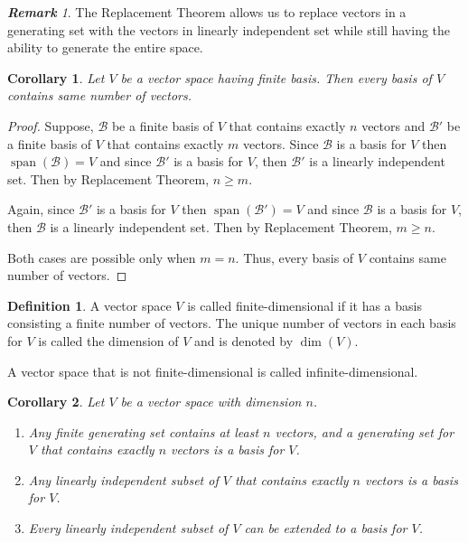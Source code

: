 \documentclass[12pt, a4paper]{article}
\newtheorem{corollary}{Corollary}[theorem]
\theoremstyle{definition}
\newtheorem{definition}{Definition}[section]
\theoremstyle{remark}
\newtheorem*{remark}{\textbf{Remark}}
\newcommand{\B}{\mathscr{B}}
\DeclareMathOperator{\Span}{span}
\begin{document}
\begin{remark}
    The Replacement Theorem allows us to replace vectors in a generating set with the vectors in linearly independent set while still having the ability to generate the entire space.
\end{remark}

\begin{corollary}
    Let $V$ be a vector space having finite basis. Then every basis of $V$ contains same number of vectors.
\end{corollary}

\begin{proof}
    Suppose, $\B$ be a finite basis of $V$ that contains exactly $n$ vectors and $\B'$ be a finite basis of $V$ that contains exactly $m$ vectors.
Since $\B$ is a basis for $V$ then $\Span(\B) = V$ and since $\B'$ is a basis for $V$, then $\B'$ is a linearly independent set. Then by Replacement Theorem, $n \geq m$.

Again, since $\B'$ is a basis for $V$ then $\Span(\B') = V$ and since $\B$ is a basis for $V$, then $\B$ is a linearly independent set. Then by Replacement Theorem, $m \geq n$.

Both cases are possible only when $m = n$. Thus, every basis of $V$ contains same number of vectors.
\end{proof}

\begin{definition}
    A vector space $V$ is called finite-dimensional if it has a basis consisting a finite number of vectors. The unique number of vectors in each basis for $V$ is called the dimension of $V$ and is denoted by $\dim(V)$.
\end{definition}

A vector space that is not finite-dimensional is called infinite-dimensional.

\begin{corollary}
    Let $V$ be a vector space with dimension $n$.
    \begin{enumerate}
        \item Any finite generating set contains at least $n$ vectors, and a generating set for $V$ that contains exactly $n$ vectors is a basis for $V$.
        \item Any linearly independent subset of $V$ that contains exactly $n$ vectors is a basis for $V$.
        \item Every linearly independent subset of $V$ can be extended to a basis for $V$.
    \end{enumerate}
\end{corollary}
\end{document}
